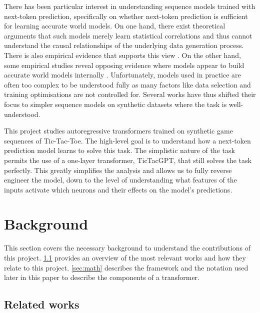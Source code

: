 \documentclass{article}
\newcommand{\ttgpt}{TicTacGPT\xspace}
\newcommand{\ttt}{Tic-Tac-Toe\xspace}
\begin{document}
There has been particular interest in understanding sequence models trained with next-token prediction, specifically on whether next-token prediction is sufficient for learning accurate world models. On one hand, there exist theoretical arguments \citep{bender2020climbing,merrill2021provable} that such models merely learn statistical correlations and thus cannot understand the causal relationships of the underlying data generation process. There is also empirical evidence that supports this view \cite{mccoy2023embers}. On the other hand, some empirical studies reveal opposing evidence where models appear to build accurate world models internally \cite{meng2022locating,tigges2023linear}. Unfortunately, models used in practice are often too complex to be understood fully as many factors like data selection and training optimisations are not controlled for. Several works have thus shifted their focus to simpler sequence models on synthetic datasets \citep{toshniwal2021learning,orthello-gpt} where the task is well-understood.

This project studies autoregressive transformers trained on synthetic game sequences of \ttt. The high-level goal is to understand how a next-token prediction model learns to solve this task. The simplistic nature of the task permits the use of a one-layer transformer, \ttgpt, that still solves the task perfectly. This greatly simplifies the analysis and allows us to fully reverse engineer the model, down to the level of understanding what features of the inputs activate which neurons and their effects on the model's predictions.

\section{Background}

This section covers the necessary background to understand the contributions of this project. \cref{sec:related} provides an overview of the most relevant works and how they relate to this project. \cref{sec:math} describes the framework and the notation used later in this paper to describe the components of a transformer.

\subsection{Related works} \label{sec:related}
\end{document}
